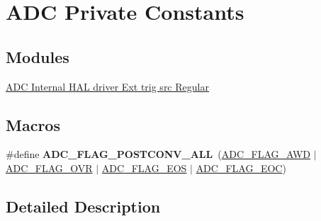\hypertarget{group___a_d_c___private___constants}{}\section{A\+DC Private Constants}
\label{group___a_d_c___private___constants}
\subsection*{Modules}
\begin{DoxyCompactItemize}
\item 
\hyperlink{group___a_d_c___internal___h_a_l__driver___ext__trig__src___regular}{A\+D\+C Internal H\+A\+L driver Ext trig src Regular}
\end{DoxyCompactItemize}
\subsection*{Macros}
\begin{DoxyCompactItemize}
\item 
\mbox{\label{group___a_d_c___private___constants_ga790f33c46bdd17e04ec3421d98a73504}} 
\#define {\bfseries A\+D\+C\+\_\+\+F\+L\+A\+G\+\_\+\+P\+O\+S\+T\+C\+O\+N\+V\+\_\+\+A\+LL}~(\hyperlink{group___a_d_c__flags__definition_gadb75a4b430fb84950232b7a8f3a6a877}{A\+D\+C\+\_\+\+F\+L\+A\+G\+\_\+\+A\+WD} $\vert$ \hyperlink{group___a_d_c__flags__definition_ga6e8f399d2af342bd18b9f5803cb986e7}{A\+D\+C\+\_\+\+F\+L\+A\+G\+\_\+\+O\+VR} $\vert$ \hyperlink{group___a_d_c__flags__definition_gac3acbfd08e72d33bc520dac5998f7e52}{A\+D\+C\+\_\+\+F\+L\+A\+G\+\_\+\+E\+OS} $\vert$ \hyperlink{group___a_d_c__flags__definition_gaf2c6fdf7e9ab63b778149e5fb56413d4}{A\+D\+C\+\_\+\+F\+L\+A\+G\+\_\+\+E\+OC})
\end{DoxyCompactItemize}


\subsection{Detailed Description}
